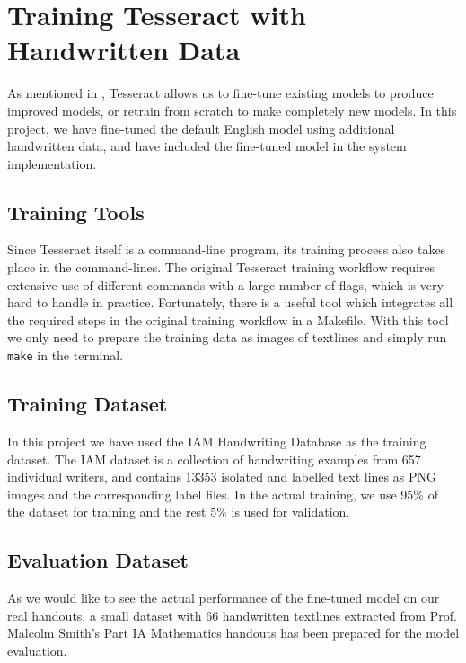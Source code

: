 \section{Training Tesseract with Handwritten Data}

As mentioned in , Tesseract allows us to fine-tune existing models to produce improved models, or retrain from scratch to make completely new models. In this project, we have fine-tuned the default English model using additional handwritten data, and have included the fine-tuned model in the system implementation. 

\subsection{Training Tools}

Since Tesseract itself is a command-line program, its training process also takes place in the command-lines. The original Tesseract training workflow requires extensive use of different commands with a large number of flags, which is very hard to handle in practice. Fortunately, there is a useful tool \cite{ocrd-train} which integrates all the required steps in the original training workflow in a Makefile. With this tool we only need to prepare the training data as images of textlines and simply run \texttt{make} in the terminal.

\subsection{Training Dataset}

In this project we have used the IAM Handwriting Database \cite{marti2002iam} as the training dataset. The IAM dataset is a collection of handwriting examples from 657 individual writers, and contains 13353 isolated and labelled text lines as PNG images and the corresponding label files. In the actual training, we use 95\% of the dataset for training and the rest 5\% is used for validation.

\subsection{Evaluation Dataset}

As we would like to see the actual performance of the fine-tuned model on our real handouts, a small dataset with 66 handwritten textlines extracted from Prof.\,Malcolm Smith's Part IA Mathematics handouts has been prepared for the model evaluation. 

